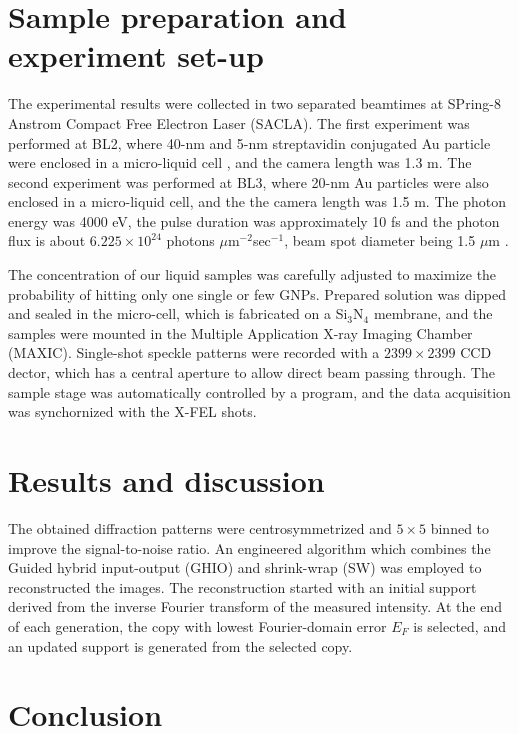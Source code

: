 \documentclass[aps,prb,reprint,groupedaddress, superscriptaddress]{revtex4-1}
\begin{document}
\section{Sample preparation and experiment set-up}

The experimental results were collected in two separated beamtimes at SPring-8 Anstrom Compact Free Electron Laser (SACLA). 
The first experiment was performed at BL2, where 40-nm and 5-nm streptavidin conjugated Au particle were enclosed in a micro-liquid cell \cite{liquid-cell}, and the camera length was 1.3 m. 
The second experiment was performed at BL3, where 20-nm Au particles were also enclosed in a micro-liquid cell, and the the camera length was 1.5 m. 
The photon energy was 4000 eV, the pulse duration was approximately 10 fs and the photon flux is about $6.225\times 10^{24}$ photons $\mu$m$^{-2}$sec$^{-1}$, beam spot diameter being 1.5 $\mu$m \cite{xfel-ssr}.

The concentration of our liquid samples was carefully adjusted to maximize the probability of hitting only one single or few GNPs. 
Prepared solution was dipped and sealed in the micro-cell, which is fabricated on a Si$_3$N$_4$ membrane, and the samples were mounted in the Multiple Application X-ray Imaging Chamber (MAXIC). 
Single-shot speckle patterns were recorded with a $2399\times2399$ CCD dector, which has a central aperture to allow direct beam passing through. 
The sample stage was automatically controlled by a program, and the data acquisition was synchornized with the X-FEL shots.


\section{Results and discussion}

The obtained diffraction patterns were centrosymmetrized and $5\times5$ binned to improve the signal-to-noise ratio. 
An engineered algorithm which combines the Guided hybrid input-output (GHIO) \cite{ghio} and shrink-wrap (SW) \cite{sw} was employed to reconstructed the images. 
The reconstruction started with an initial support derived from the inverse Fourier transform of the measured intensity. 
At the end of each generation, the copy with lowest Fourier-domain error $E_F$ is selected, and an updated support is generated from the selected copy.


\section{Conclusion}
\end{document}
